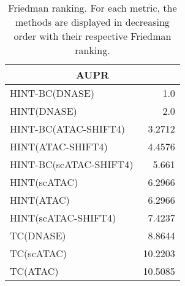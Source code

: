 \documentclass[landscape, 6pt]{report}
\begin{document}
\begin{table}[h!]
\label{tab:ranking}
\vspace{0.0cm}
\begin{center}
\caption{Friedman ranking. For each metric, the methods are displayed in decreasing order with their respective Friedman ranking.}
\renewcommand{\arraystretch}{1.2}
  \begin{tabular}{ |lr| }
    \hline
    \multicolumn{2}{|c|}{\textbf{AUPR}} \\
    \hline
    HINT-BC(DNASE) & 1.0 \\
    HINT(DNASE) & 2.0 \\
    HINT-BC(ATAC-SHIFT4) & 3.2712 \\
    HINT(ATAC-SHIFT4) & 4.4576 \\
    HINT-BC(scATAC-SHIFT4) & 5.661 \\
    HINT(scATAC) & 6.2966 \\
    HINT(ATAC) & 6.2966 \\
    HINT(scATAC-SHIFT4) & 7.4237 \\
    TC(DNASE) & 8.8644 \\
    TC(scATAC) & 10.2203 \\
    TC(ATAC) & 10.5085 \\
    \hline
  \end{tabular}
\end{center}
\vspace{0.0cm}
\end{table}
\end{document}
